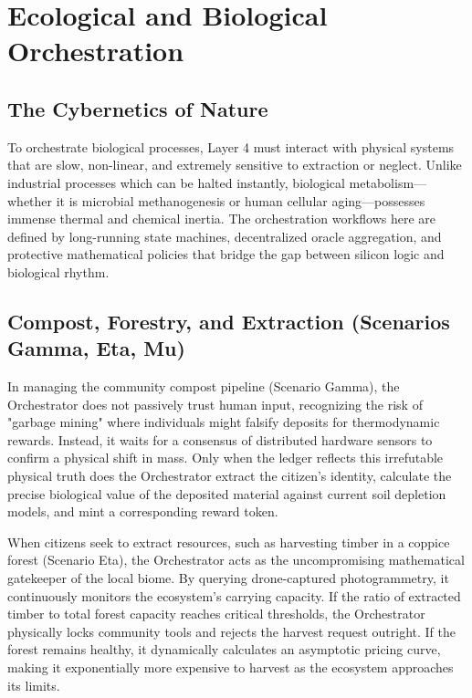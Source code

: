 \chapter{Ecological and Biological Orchestration}

\section{The Cybernetics of Nature}
To orchestrate biological processes, Layer 4 must interact with physical systems that are slow, non-linear, and extremely sensitive to extraction or neglect. Unlike industrial processes which can be halted instantly, biological metabolism—whether it is microbial methanogenesis or human cellular aging—possesses immense thermal and chemical inertia. The orchestration workflows here are defined by long-running state machines, decentralized oracle aggregation, and protective mathematical policies that bridge the gap between silicon logic and biological rhythm.

\section{Compost, Forestry, and Extraction (Scenarios Gamma, Eta, Mu)}
In managing the community compost pipeline (Scenario Gamma), the Orchestrator does not passively trust human input, recognizing the risk of "garbage mining" where individuals might falsify deposits for thermodynamic rewards. Instead, it waits for a consensus of distributed hardware sensors to confirm a physical shift in mass. Only when the ledger reflects this irrefutable physical truth does the Orchestrator extract the citizen's identity, calculate the precise biological value of the deposited material against current soil depletion models, and mint a corresponding reward token.

When citizens seek to extract resources, such as harvesting timber in a coppice forest (Scenario Eta), the Orchestrator acts as the uncompromising mathematical gatekeeper of the local biome. By querying drone-captured photogrammetry, it continuously monitors the ecosystem's carrying capacity. If the ratio of extracted timber to total forest capacity reaches critical thresholds, the Orchestrator physically locks community tools and rejects the harvest request outright. If the forest remains healthy, it dynamically calculates an asymptotic pricing curve, making it exponentially more expensive to harvest as the ecosystem approaches its limits.

